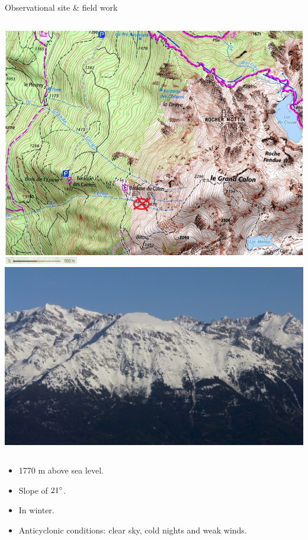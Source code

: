 \documentclass{beamer}
\begin{document}
\begin{frame}{Observational site \& field work}

\begin{columns}
\includegraphics[width=1.1\textwidth]{grand_colon_jakob.png}
\includegraphics[width=1\textwidth]{gc.jpg}
\end{columns}

\begin{itemize}
    \item 1770 m above sea level.
    \item Slope of $21\degree$.
    \item In winter.
    \item Anticyclonic conditions: clear sky, cold nights and weak winds.
\end{itemize}
\end{frame}
\end{document}
